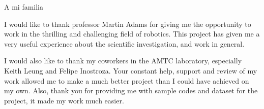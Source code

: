 \documentclass[upright, contnum]{umemoria}
\begin{document}
\begin{dedicatoria} %
A mi familia
\end{dedicatoria}

\begin{thanks} %
I would like to thank professor Martin Adams for giving me the opportunity to work in the thrilling and challenging field of robotics. This project has given me a very useful experience about the scientific investigation, and work in general.

I would also like to thank my coworkers in the AMTC laboratory, especially Keith Leung and Felipe Inostroza. Your constant help, support and review of my work allowed me to make a much better project than I could have achieved on my own. Also, thank you for providing me with sample codes and dataset for the project, it made my work much easier.
\end{thanks}
\cleardoublepage

\tableofcontents
\listoftables %
\listoffigures %

\mainmatter










\end{document}
